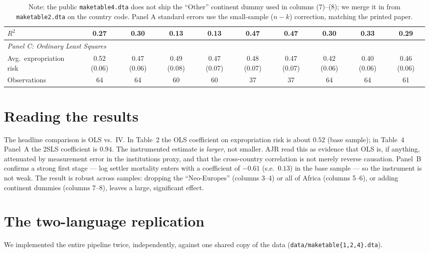 \documentclass[11pt]{article}
\begin{document}
\begin{table}[H]
{\begin{tabular}{lccccccccc}
    $R^2$                    & 0.27 & 0.30 & 0.13 & 0.13 & 0.47 & 0.47 & 0.30 & 0.33 & 0.29 \\
    \midrule
    \multicolumn{10}{l}{\emph{Panel C: Ordinary Least Squares}} \\
    Avg.\ expropriation risk & 0.52 (0.06) & 0.47 (0.06) & 0.49 (0.08) & 0.47 (0.07) & 0.48 (0.07) & 0.47 (0.07) & 0.42 (0.06) & 0.40 (0.06) & 0.46 (0.06) \\
    \midrule
    Observations             & 64 & 64 & 60 & 60 & 37 & 37 & 64 & 64 & 61 \\
    \bottomrule
  \end{tabular}}
  \caption*{\footnotesize Note: the public \texttt{maketable4.dta} does not ship
  the ``Other'' continent dummy used in columns (7)--(8); we merge it in from
  \texttt{maketable2.dta} on the country code. Panel A standard errors use the
  small-sample ($n-k$) correction, matching the printed paper.}
\end{table}

\section{Reading the results}

The headline comparison is OLS vs.\ IV. In Table~2 the OLS coefficient on
expropriation risk is about $0.52$ (base sample); in Table~4 Panel~A the 2SLS
coefficient is $0.94$. The instrumented estimate is \emph{larger}, not smaller.
AJR read this as evidence that OLS is, if anything, attenuated by measurement
error in the institutions proxy, and that the cross-country correlation is not
merely reverse causation. Panel~B confirms a strong first stage --- log settler
mortality enters with a coefficient of $-0.61$ (s.e.\ $0.13$) in the base
sample --- so the instrument is not weak. The result is robust across samples:
dropping the ``Neo-Europes'' (columns 3--4) or all of Africa (columns 5--6), or
adding continent dummies (columns 7--8), leaves a large, significant effect.

\section{The two-language replication}

We implemented the entire pipeline twice, independently, against one shared copy
of the data (\texttt{data/maketable\{1,2,4\}.dta}).
\end{document}
